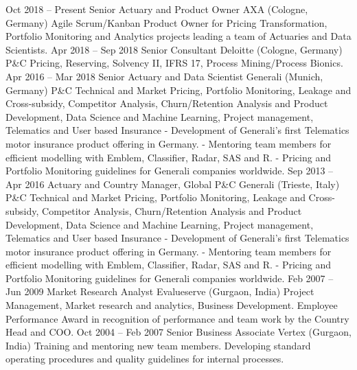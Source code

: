 \documentclass[
	a4paper,
]{fortysecondscv}
\begin{document}
\makefrontsidebar


	\begin{cvtable}[3]
		\cvitem
			{Oct 2018 -- Present}
			{Senior Actuary and Product Owner}
			{AXA (Cologne, Germany)}
			{
				Agile Scrum/Kanban Product Owner for Pricing Transformation, Portfolio Monitoring and Analytics projects leading a team of Actuaries and Data Scientists.
			}
		\cvitem
			{Apr 2018 -- Sep 2018}
			{Senior Consultant}
			{Deloitte (Cologne, Germany)}
			{
				P\&C Pricing, Reserving, Solvency II, IFRS 17, Process Mining/Process Bionics.
			}
		\cvitem
			{Apr 2016 -- Mar 2018}
			{Senior Actuary and Data Scientist}
			{Generali (Munich, Germany)}
			{
				P\&C Technical and Market Pricing, Portfolio Monitoring, Leakage and Cross-subsidy, Competitor Analysis, Churn/Retention Analysis and Product Development, Data Science and Machine Learning, Project management, Telematics and User based Insurance
				- Development of Generali’s first Telematics motor insurance product offering in Germany.
				- Mentoring team members for efficient modelling with Emblem, Classifier, Radar, SAS and R.
				- Pricing and Portfolio Monitoring guidelines for Generali companies worldwide.
			}
		\cvitem
			{Sep 2013 -- Apr 2016}
			{Actuary and Country Manager, Global P\&C}
			{Generali (Trieste, Italy)}
			{
				P\&C Technical and Market Pricing, Portfolio Monitoring, Leakage and Cross-subsidy, Competitor Analysis, Churn/Retention Analysis and Product Development, Data Science and Machine Learning, Project management, Telematics and User based Insurance
				- Development of Generali’s first Telematics motor insurance product offering in Germany.
				- Mentoring team members for efficient modelling with Emblem, Classifier, Radar, SAS and R.
				- Pricing and Portfolio Monitoring guidelines for Generali companies worldwide.
			}
		\cvitem
			{Feb 2007 -- Jun 2009}
			{Market Research Analyst}
			{Evalueserve (Gurgaon, India)}
			{
				Project Management, Market research and analytics, Business Development.
				Employee Performance Award in recognition of performance and team work by the Country Head and COO.
			}
		\cvitem
			{Oct 2004 -- Feb 2007}
			{Senior Business Associate}
			{Vertex (Gurgaon, India)}
			{
				Training and mentoring new team members. 
				Developing standard operating procedures and quality guidelines for internal processes.
			}
	\end{cvtable}
\end{document}

